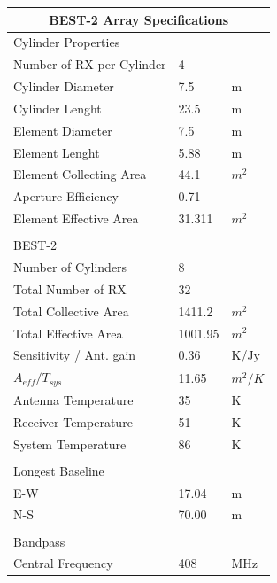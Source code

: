 \documentclass[useAMS,usenatbib,onecolumn]{mn2e}
\begin{document}
\begin{table}
\begin{center}
\begin{tabular}{| l | l | l |}
\hline
\multicolumn{3}{|c|}{BEST-2 Array Specifications}\\
\hline
Cylinder Properties & &\\
\hline
Number of RX per Cylinder &          4 &            \\
Cylinder Diameter &        7.5 &          m \\
Cylinder Lenght &       23.5 &          m \\
Element Diameter &        7.5 &          m \\
Element Lenght &       5.88 &          m \\
Element Collecting Area &       44.1 &        $m^2$ \\
Aperture Efficiency &       0.71 &            \\
Element Effective Area &     31.311 &        $m^2$ \\
           &            &            \\
\hline
BEST-2 &            &            \\
\hline
Number of Cylinders &          8 &            \\
Total Number of RX &         32 &            \\
Total Collective Area &     1411.2 &        $m^2$ \\
Total Effective Area &    1001.95 &        $m^2$ \\
Sensitivity / Ant. gain &       0.36 &       K/Jy \\
$A_{eff}/T_{sys}$ &      11.65 &      $m^2/K$ \\
Antenna Temperature &         35 &          K \\
Receiver Temperature &         51 &          K \\
System Temperature  &         86 &          K \\
           &            &            \\
\hline
Longest Baseline &            &            \\
\hline
E-W &      17.04 &         m \\
N-S &      70.00 &         m \\
           &            &            \\
\hline
Bandpass        &           &       \\
\hline
Central Frequency &        408 &        MHz \\

\end{tabular}
\end{center}
\end{table}
\end{document}
